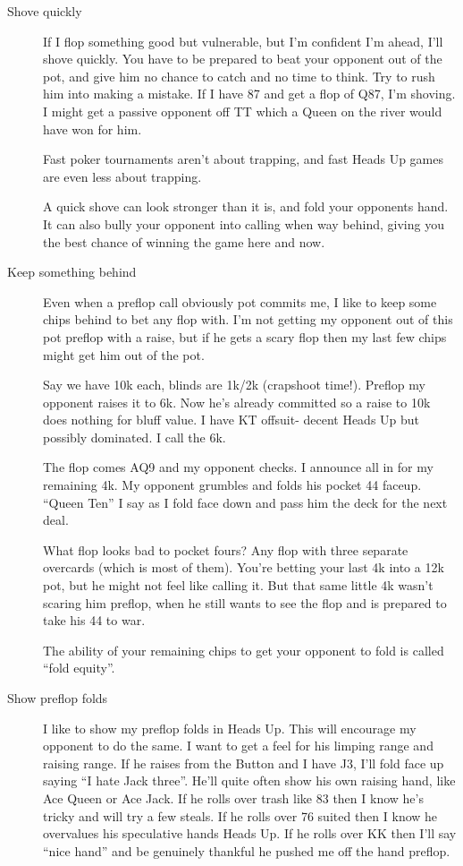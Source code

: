 \begin{description}

\item[Shove quickly] If I flop something good but vulnerable,
but I'm confident I'm ahead, I'll shove quickly. You have
to be prepared to beat your opponent out of the pot, and
give him no chance to catch and no time to think. Try to
rush him into making a mistake. If I have 87 and get a flop
of Q87, I'm shoving. I might get a passive opponent
off TT which a Queen on the river would have won for him.

Fast poker tournaments aren't about trapping, and fast
Heads Up games are even less about trapping.

A quick shove can look stronger than it is, and fold
your opponents hand. It can also bully your opponent
into calling when way behind, giving you the best
chance of winning the game here and now.

\item[Keep something behind] Even when a preflop call obviously
pot commits me, I like to keep some chips behind to bet
any flop with. I'm not getting my opponent out of this
pot preflop with a raise, but if he gets a scary flop
then my last few chips might get him out of the pot.

Say we have 10k each, blinds are 1k/2k (crapshoot time!).
Preflop my opponent raises it to 6k. Now he's already
committed so a raise to 10k does nothing for bluff value.
I have KT offsuit- decent Heads Up but possibly dominated.
I call the 6k.

The flop comes AQ9 and my opponent checks. I announce
all in for my remaining 4k. My opponent grumbles
and folds his pocket 44 faceup. ``Queen Ten'' I say
as I fold face down and pass him the deck for the next deal.

What flop looks bad to pocket fours? Any flop with three
separate overcards (which is most of them). You're betting
your last 4k into a 12k pot, but he might not feel like calling
it. But that same little 4k wasn't scaring him preflop,
when he still wants to see the flop and is prepared to take
his 44 to war.

The ability of your remaining chips to get your opponent to
fold is called ``fold equity''.

\item[Show preflop folds] I like to show my
preflop folds in Heads Up. This will encourage my
opponent to do the same. I want to get a feel for his
limping range and raising range. If he raises from the
Button and I have J3, I'll fold face up saying ``I hate
Jack three''. He'll quite often show his own raising hand,
like Ace Queen or Ace Jack. If he rolls over trash like
83 then I know he's tricky and will try a few steals.
If he rolls over 76 suited then I know he overvalues
his speculative hands Heads Up. If he rolls over KK
then I'll say ``nice hand'' and be genuinely thankful
he pushed me off the hand preflop.


\end{description}
